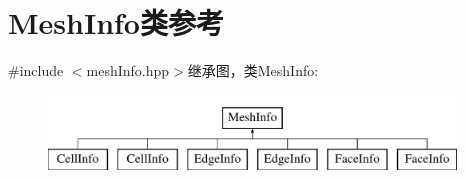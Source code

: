 \hypertarget{classMeshInfo}{
\section{MeshInfo类参考}
\label{classMeshInfo}
}


{\ttfamily \#include $<$meshInfo.hpp$>$}继承图，类MeshInfo:\begin{figure}[H]
\begin{center}
\leavevmode
\includegraphics[height=2cm]{classMeshInfo}
\end{center}
\end{figure}
